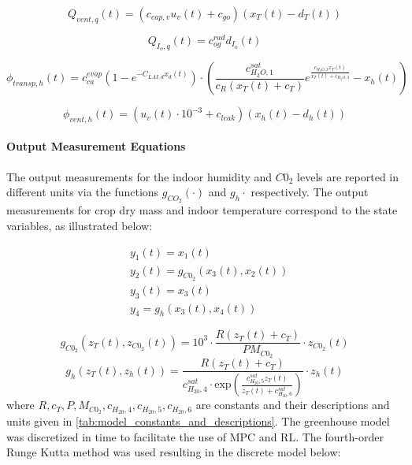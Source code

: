 \begin{equation}
	Q_{vent,q}(t) = (c_{cap,v}u_v(t) + c_{go})(x_T(t) - d_T(t))
	\label{heat exchange}
\end{equation}

\begin{equation}
	Q_{I_o,q}(t) = c_{og}^{rad} d_{I_o}(t)
\end{equation}

\begin{equation}
	\phi_{transp,h}(t) = c_{ca}^{evap}(1 - e^{-C_{LAI,d} x_d(t)})\cdot \left( \frac{c_{H_2O,1}^{sat}}{c_R(x_T(t)+c_T)} e^{\frac{c_{H_2O,2}x_T(t)}{x_T(t) + c_{H_2O,3}}} - x_h(t) \right)
\end{equation}

\begin{equation}
	\phi_{vent,h}(t) = (u_v(t) \cdot 10^{-3} + c_{leak})(x_h(t) - d_h(t))
\end{equation}

\paragraph{Output Measurement Equations}
The output measurements for the indoor humidity and $C0_2$ levels are reported in different units via the functions $g_{CO_2}(\cdot)$ and $g_h{\cdot}$ respectively.  The output measurements for crop dry mass and indoor temperature correspond to the state variables, as illustrated below:

\begin{equation}
	\begin{aligned}
		& y_1(t) = x_1(t) 
		\\
		& y_{2}(t) = g_{C0_2}(x_3(t),x_{2}(t))
		\\
		& y_3 (t) = x_3(t)
		\\
		& y_{4} = g_h (x_3(t),x_4(t))
	\end{aligned}
\end{equation}

\begin{equation}
	g_{C0_2}(z_T(t),z_{C0_2}(t)) = 10^3 \cdot \frac{R(z_T(t) + c_T)}{PM_{C0_2}} \cdot z_{C0_2}(t)
\end{equation}
\begin{equation}
	g_h (z_T(t),z_h(t)) = \frac{R(z_T(t) + c_T)}{c_{H_20,4}^{sat}\cdot \text{exp}(\frac{c_{H_20,5}^{sat}z_T(t)}{z_T(t) + c_{H_20,6}^{sat}})} \cdot z_{h}(t)
\end{equation}
where $R,c_T,P,M_{C0_2},c_{H_20,4},c_{H_20,5},c_{H_20,6}$ are constants and their descriptions and units given in \autoref{tab:model_constants_and_descriptions}. The greenhouse model was discretized in time to facilitate the use of MPC and RL. The fourth-order Runge Kutta method was used resulting in the discrete model below:

